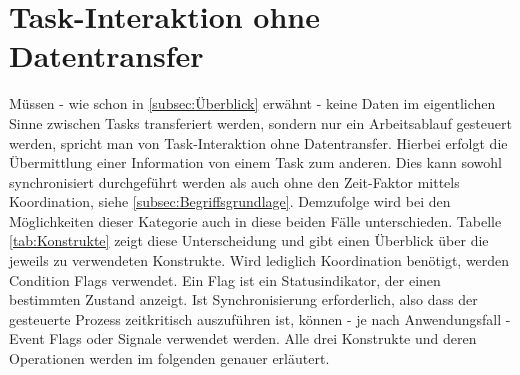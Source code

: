 \documentclass{llncs}
\begin{document}
\section{Task-Interaktion ohne Datentransfer}
Müssen - wie schon in \ref{subsec:Überblick} erwähnt - keine Daten im eigentlichen Sinne zwischen Tasks transferiert werden, sondern nur ein Arbeitsablauf gesteuert werden, spricht man von Task-Interaktion ohne Datentransfer. Hierbei erfolgt die Übermittlung einer Information von einem Task zum anderen. Dies kann sowohl synchronisiert durchgeführt werden als auch ohne den Zeit-Faktor mittels Koordination, siehe \ref{subsec:Begriffsgrundlage}. Demzufolge wird bei den Möglichkeiten dieser Kategorie auch in diese beiden Fälle unterschieden. Tabelle \ref{tab:Konstrukte} zeigt diese Unterscheidung und gibt einen Überblick über die jeweils zu verwendeten Konstrukte. Wird lediglich Koordination benötigt, werden Condition Flags verwendet. Ein Flag ist ein Statusindikator, der einen bestimmten Zustand anzeigt. Ist Synchronisierung erforderlich, also dass der gesteuerte Prozess zeitkritisch auszuführen ist, können - je nach Anwendungsfall - Event Flags oder Signale verwendet werden. Alle drei Konstrukte und deren Operationen werden im folgenden genauer erläutert.
\begin{table}
	\centering %
	\def\arraystretch{1.5} %
	\setlength{\tabcolsep}{0.5em} %
\caption{	\label{tab:Konstrukte}Coordination and synchronization constructs}
\end{table}
\end{document}
